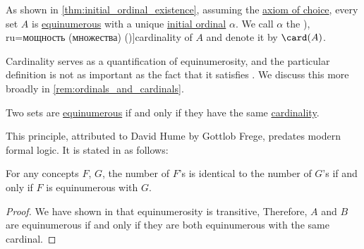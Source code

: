 \begin{definition}\label{def:cardinality}\mimprovised
  As shown in \cref{thm:initial_ordinal_existence}, assuming the \hyperref[def:zfc/choice]{axiom of choice}, every set \( A \) is \hyperref[def:equinumerosity]{equinumerous} with a unique \hyperref[def:initial_ordinal]{initial ordinal} \( \alpha \). We call \( \alpha \) the \term[en=cardinality (\cite[147]{Enderton1977SetTheory}), ru=мощность (множества) (\cite[\S 1.5.13]{КусраевКутателадзе2005БулевозначныйАнализ})]{cardinality} of \( A \) and denote it by \( \card(A) \).
\end{definition}
\begin{comments}
  \item Cardinality serves as a quantification of equinumerosity, and the particular definition is not as important as the fact that it satisfies . We discuss this more broadly in \cref{rem:ordinals_and_cardinals}.
\end{comments}

\begin{theorem}\label{thm:humes_principle}
  Two sets are \hyperref[def:equinumerosity]{equinumerous} if and only if they have the same \hyperref[def:cardinality]{cardinality}.
\end{theorem}
\begin{comments}
  \item This principle, attributed to David Hume by Gottlob Frege, predates modern formal logic. It is stated in \cite[168]{Shapiro2008MathematicalObjects} as follows:
  \begin{displayquote}
    For any concepts \( F \), \( G \), the number of \( F \)'s is identical to the number of \( G \)'s if and only if \( F \) is equinumerous with \( G \).
  \end{displayquote}
\end{comments}
\begin{proof}
  We have shown in  that equinumerosity is transitive, Therefore, \( A \) and \( B \) are equinumerous if and only if they are both equinumerous with the same cardinal.
\end{proof}

